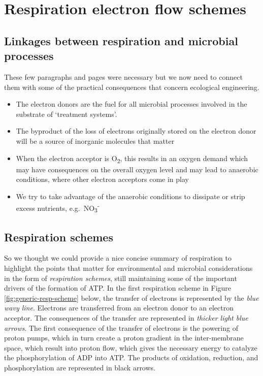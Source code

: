 \documentclass[]{book}
\providecommand{\tightlist}{%
  \setlength{\itemsep}{0pt}\setlength{\parskip}{0pt}}
\theoremstyle{definition}
\theoremstyle{definition}
\theoremstyle{definition}
\theoremstyle{remark}
\begin{document}
\section{Respiration electron flow
schemes}\label{respiration-electron-flow-schemes}

\subsection{Linkages between respiration and microbial
processes}\label{linkages-between-respiration-and-microbial-processes}

These few paragraphs and pages were necessary but we now need to connect
them with some of the practical consequences that concern ecological
engineering.

\begin{itemize}
\tightlist
\item
  The electron donors are the fuel for all microbial processes involved
  in the substrate of `treatment systems'.
\item
  The byproduct of the loss of electrons originally stored on the
  electron donor will be a source of inorganic molecules that matter
\item
  When the electron acceptor is O\textsubscript{2}, this results in an
  oxygen demand which may have consequences on the overall oxygen level
  and may lead to anaerobic conditions, where other electron acceptors
  come in play
\item
  We try to take advantage of the anaerobic conditions to dissipate or
  strip excess nutrients, e.g.~NO\textsubscript{3}\textsuperscript{-}
\end{itemize}

\subsection{Respiration schemes}\label{respiration-schemes}

So we thought we could provide a nice concise summary of respiration to
highlight the points that matter for environmental and microbial
considerations in the form of \emph{respiration schemes}, still
maintaining some of the important drivers of the formation of ATP. In
the first respiration scheme in Figure \ref{fig:generic-resp-scheme}
below, the transfer of electrons is represented by the \emph{blue wavy
line}. Electrons are transferred from an electron donor to an electron
acceptor. The consequences of the transfer are represented in
\emph{thicker light blue arrows}. The first consequence of the transfer
of electrons is the powering of proton pumps, which in turn create a
proton gradient in the inter-membrane space, which result into proton
flow, which gives the necessary energy to catalyze the phosphorylation
of ADP into ATP. The products of oxidation, reduction, and
phosphorylation are represented in black arrows.
\end{document}
